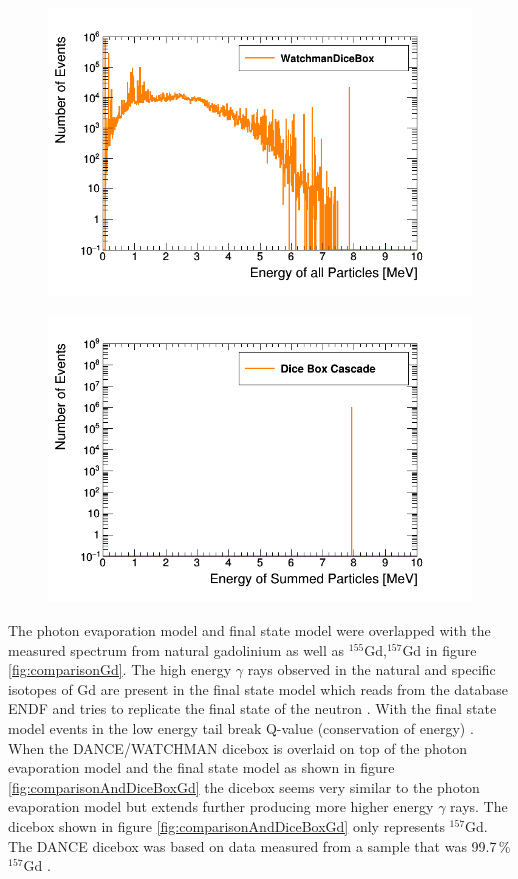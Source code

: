 \begin{figure}[!h]
 \centering
 \includegraphics[width=0.7\linewidth]{Chapter4/Figs/Raster/gadolinium/energyOfCascadeOfCascadeGd.png}
 \label{fig:energyOfCascadeOfCascadeGd}
\end{figure}

\begin{figure}[!h]
 \centering
 \includegraphics[width=0.7\linewidth]{Chapter4/Figs/Raster/gadolinium/conservationOfCascadeGd.png}
 \label{fig:conservationOfCascadeGd}
\end{figure}

The photon evaporation model and final state model were overlapped with the measured spectrum from natural gadolinium as well as $^{155}$Gd,$^{157}$Gd in figure \ref{fig:comparisonGd}. The high energy $\gamma$ rays observed in the natural and specific isotopes of Gd are present in the final state model which reads from the database ENDF and tries to replicate the final state of the neutron \cite{koiTatsumi_2006}. With the final state model events in the low energy tail break Q-value (conservation of energy) \cite{YuChen_2015}. When the DANCE/WATCHMAN dicebox is overlaid on top of the photon evaporation model and the final state model as shown in figure  \ref{fig:comparisonAndDiceBoxGd} the dicebox seems very similar to the photon evaporation model but extends further producing more higher energy $\gamma$ rays. The dicebox shown in figure \ref{fig:comparisonAndDiceBoxGd} only represents $^{157}$Gd. The DANCE dicebox was based on data measured from a sample that was  99.7\,\% $^{157}$Gd \cite{Chyzh_2011}. 

